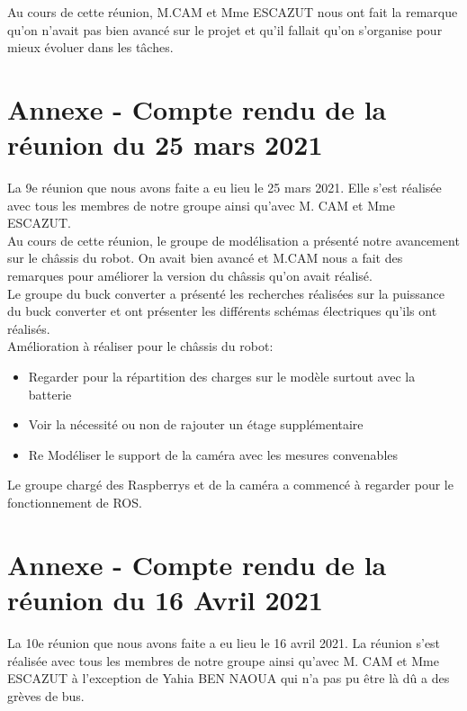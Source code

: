 \documentclass{PackagerQualityN}
\begin{document}
Au cours de cette réunion, M.CAM et Mme ESCAZUT nous ont fait la remarque qu'on n’avait pas bien avancé sur le projet et qu'il fallait qu'on s'organise pour mieux évoluer dans les tâches. \\

\newp
\section*{Annexe - Compte rendu de la réunion du 25 mars 2021}
La 9e réunion que nous avons faite a eu lieu le 25 mars 2021. Elle s'est réalisée avec tous les membres de notre groupe ainsi qu'avec M. CAM et Mme ESCAZUT.\\

Au cours de cette réunion, le groupe de modélisation a présenté notre avancement sur le châssis du robot. On avait bien avancé et M.CAM nous a fait des remarques pour améliorer la version du châssis qu'on avait réalisé. \\

Le groupe du buck converter a présenté les recherches réalisées sur la puissance du buck converter et ont présenter les différents schémas électriques qu'ils ont réalisés.\\

Amélioration à réaliser pour le châssis du robot:
\begin{itemize}
    \item Regarder pour la répartition des charges sur le modèle surtout avec la batterie
    \item Voir la nécessité ou non de rajouter un étage supplémentaire
    \item Re Modéliser le support de la caméra avec les mesures convenables\\
\end{itemize}


Le groupe chargé des Raspberrys et de la caméra a commencé à regarder pour le fonctionnement de ROS.

\newp
\section*{Annexe - Compte rendu de la réunion du 16 Avril 2021}
La 10e réunion que nous avons faite a eu lieu le 16 avril 2021. La réunion s'est réalisée avec tous les membres de notre groupe ainsi qu'avec M. CAM et Mme ESCAZUT à l'exception de Yahia BEN NAOUA qui n'a pas pu être là dû a des grèves de bus.\\
\end{document}
